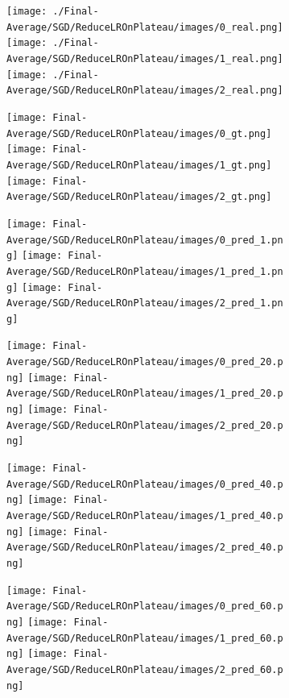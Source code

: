 \documentclass{article}
\begin{document}
\begin{figure}[h]
  \centering
  \begin{subfigure}[c]{0.12\textwidth}
    \centering
      \texttt{[image: ./Final-Average/SGD/ReduceLROnPlateau/images/0\_real.png]}
      \texttt{[image: ./Final-Average/SGD/ReduceLROnPlateau/images/1\_real.png]}
      \texttt{[image: ./Final-Average/SGD/ReduceLROnPlateau/images/2\_real.png]}
  \end{subfigure}
  \begin{subfigure}[c]{0.12\textwidth}
    \centering
      \texttt{[image: Final-Average/SGD/ReduceLROnPlateau/images/0\_gt.png]}
      \texttt{[image: Final-Average/SGD/ReduceLROnPlateau/images/1\_gt.png]}
      \texttt{[image: Final-Average/SGD/ReduceLROnPlateau/images/2\_gt.png]}
  \end{subfigure}
  \begin{subfigure}[c]{0.12\textwidth}
    \centering
      \texttt{[image: Final-Average/SGD/ReduceLROnPlateau/images/0\_pred\_1.png]}
      \texttt{[image: Final-Average/SGD/ReduceLROnPlateau/images/1\_pred\_1.png]}
      \texttt{[image: Final-Average/SGD/ReduceLROnPlateau/images/2\_pred\_1.png]}
  \end{subfigure}
  \begin{subfigure}[c]{0.12\textwidth}
    \centering
      \texttt{[image: Final-Average/SGD/ReduceLROnPlateau/images/0\_pred\_20.png]}
      \texttt{[image: Final-Average/SGD/ReduceLROnPlateau/images/1\_pred\_20.png]}
      \texttt{[image: Final-Average/SGD/ReduceLROnPlateau/images/2\_pred\_20.png]}
  \end{subfigure}
  \begin{subfigure}[c]{0.12\textwidth}
    \centering
      \texttt{[image: Final-Average/SGD/ReduceLROnPlateau/images/0\_pred\_40.png]}
      \texttt{[image: Final-Average/SGD/ReduceLROnPlateau/images/1\_pred\_40.png]}
      \texttt{[image: Final-Average/SGD/ReduceLROnPlateau/images/2\_pred\_40.png]}
  \end{subfigure}
  \begin{subfigure}[c]{0.12\textwidth}
    \centering
      \texttt{[image: Final-Average/SGD/ReduceLROnPlateau/images/0\_pred\_60.png]}
      \texttt{[image: Final-Average/SGD/ReduceLROnPlateau/images/1\_pred\_60.png]}
      \texttt{[image: Final-Average/SGD/ReduceLROnPlateau/images/2\_pred\_60.png]}

\end{subfigure}
\end{figure}
\end{document}
